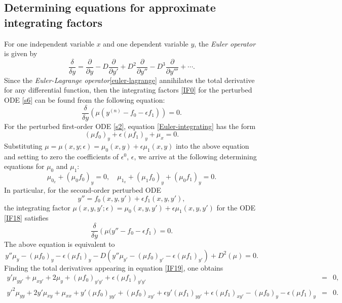 \documentclass[11pt,letter,subeqn]{article}
\begin{document}
\subsection{Determining equations for approximate integrating factors}
For one independent variable $x$ and one dependent variable $y$, the \textit{\textrm{Euler operator}} is given by
\begin{equation}\label{euler-lagrange}
  \dfrac{\delta}{\delta y}=\dfrac{\partial}{\partial y}-D\dfrac{\partial}{\partial y'}+D^2 \dfrac{\partial}{\partial y''}-D^3 \dfrac{\partial}{\partial y'''}+\cdots.
\end{equation}
Since the \textit{\textrm{Euler-Lagrange operator}}\eqref{euler-lagrange} annihilates the total derivative for any differential function, then the integrating factors \eqref{IF0} for the perturbed ODE \eqref{s6} can be found from the following equation:
\begin{equation}\label{Euler-integrating}
  \dfrac{\delta}{\delta y}\left(\mu(y^{(n)}-f_0-\epsilon f_1)\right)=0.
\end{equation}
For the perturbed first-order ODE \eqref{s2}, equation \eqref{Euler-integrating} has the form
\[
  (\mu f_0)_y+\epsilon (\mu f_1)_y+\mu_x=0.
\]
Substituting $\mu=\mu(x,y;\epsilon)=\mu_0(x,y)+\epsilon \mu_1(x,y)$ into the above equation and setting to zero the coefficients of $\epsilon^0$, $\epsilon$, we arrive at the following determining equations for $\mu_0$ and $\mu_1$:
\begin{equation}\label{}
   \mu_{0_x}+(\mu_0 f_0)_y = 0,\quad \mu_{1_x}+(\mu_1 f_0)_y+(\mu_0 f_1)_y =0.
\end{equation}
In particular, for the second-order perturbed ODE
\begin{equation}\label{IF18}
  y''=f_0(x,y,y')+\epsilon f_1(x,y,y'),
\end{equation}
the integrating factor $\mu(x,y,y';\epsilon)=\mu_0(x,y,y')+\epsilon \mu_1(x,y,y')$ for the ODE \eqref{IF18} satisfies
\[
 \dfrac{\delta}{\delta y} \left(\mu(y''-f_0-\epsilon f_1 \right)=0.
\]
The above equation is equivalent to
\begin{equation}\label{IF19}
  y''\mu_y-(\mu f_0)_y-\epsilon (\mu f_1)_y-D \left(y''\mu_{y'}-(\mu f_0)_{y'}-\epsilon (\mu f_1)_{y'}\right)+D^2(\mu)=0.
\end{equation}
Finding the total derivatives appearing in equation \eqref{IF19}, one obtains
\begin{eqnarray}
 \nonumber %
  y'\mu_{yy'}+\mu_{xy'}+2\mu_{y}+(\mu f_0)_{y'y'}+\epsilon (\mu f_1)_{y'y'} &=& 0, \\
  \nonumber
  y'^2\mu_{yy}+2y'\mu_{xy}+\mu_{xx}+y'(\mu f_0)_{yy'}+(\mu f_0)_{xy'}+\epsilon y'(\mu f_1)_{yy'}+\epsilon (\mu f_1)_{xy'}-(\mu f_0)_{y}-\epsilon (\mu f_1)_{y} &=& 0.
\end{eqnarray}
\end{document}
